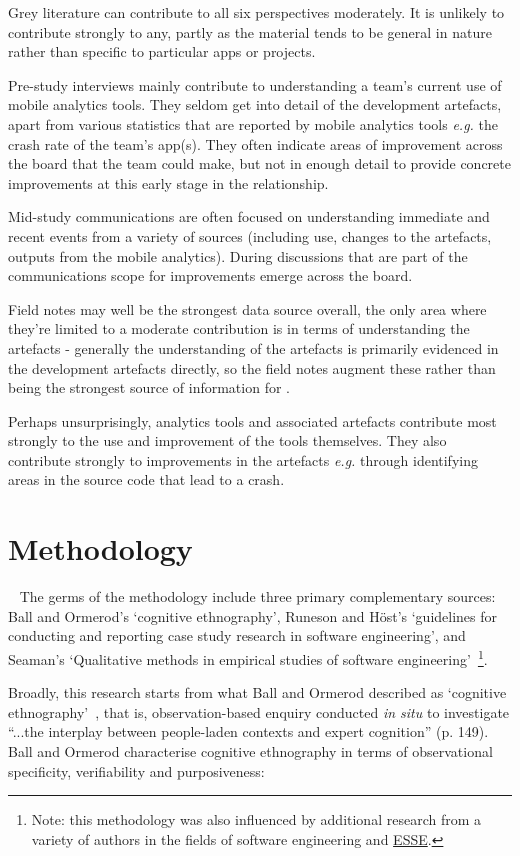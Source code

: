 Grey literature can contribute to all six perspectives moderately. It is unlikely to contribute strongly to any, partly as the material tends to be general in nature rather than specific to particular apps or projects.

Pre-study interviews mainly contribute to understanding a team's current use of mobile analytics tools. They seldom get into detail of the development artefacts, apart from various statistics that are reported by mobile analytics tools \textit{e.g.} the crash rate of the team's app(s). They often indicate areas of improvement across the board that the team could make, but not in enough detail to provide concrete improvements at this early stage in the relationship.

Mid-study communications are often focused on understanding immediate and recent events from a variety of sources (including use, changes to the artefacts, outputs from the mobile analytics). During discussions that are part of the communications scope for improvements emerge across the board.

Field notes may well be the strongest data source overall, the only area where they're limited to a moderate contribution is in terms of understanding the artefacts - generally the understanding of the artefacts is primarily evidenced in the development artefacts directly, so the field notes augment these rather than being the strongest source of information for \uartefacts.

Perhaps unsurprisingly, analytics tools and associated artefacts contribute most strongly to the use and improvement of the tools themselves. They also contribute strongly to improvements in the artefacts \textit{e.g.} through identifying areas in the source code that lead to a crash.


\section{Methodology}~\label{methodology-methodology-section}
The germs of the methodology include three primary complementary sources: Ball and Ormerod's `cognitive ethnography', Runeson and Höst's `guidelines for conducting and reporting case study research in software engineering', and Seaman's `Qualitative methods in empirical studies of software engineering'~\footnote{Note: this methodology was also influenced by additional research from a variety of authors in the fields of software engineering and \href{glossary-esse}{ESSE}.}.

Broadly, this research starts from what Ball and Ormerod described as `cognitive ethnography'~\citep{ball2000_putting_ethnography_to_work_cognitive_ethnography}, that is, observation-based enquiry conducted \textit{in situ} to investigate ``...the interplay between people-laden contexts and expert cognition'' (p. 149). Ball and Ormerod characterise cognitive ethnography in terms of observational specificity, verifiability and purposiveness: 

